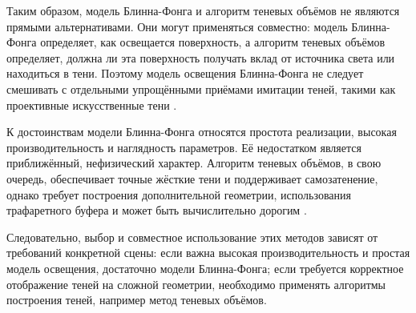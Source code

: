 \documentclass[a4paper, 12pt]{article}
\begin{document}
Таким образом, модель Блинна-Фонга и алгоритм теневых объёмов не являются прямыми альтернативами. Они могут применяться совместно: модель Блинна-Фонга определяет, как освещается поверхность, а алгоритм теневых объёмов определяет, должна ли эта поверхность получать вклад от источника света или находиться в тени. Поэтому модель освещения Блинна-Фонга не следует смешивать с отдельными упрощёнными приёмами имитации теней, такими как проективные искусственные тени \cite{blinn1988}.

К достоинствам модели Блинна-Фонга относятся простота реализации, высокая производительность и наглядность параметров. Её недостатком является приближённый, нефизический характер. Алгоритм теневых объёмов, в свою очередь, обеспечивает точные жёсткие тени и поддерживает самозатенение, однако требует построения дополнительной геометрии, использования трафаретного буфера и может быть вычислительно дорогим \cite{everitt2002,mcguire2003,stich2007,mcguire2004}.

Следовательно, выбор и совместное использование этих методов зависят от требований конкретной сцены: если важна высокая производительность и простая модель освещения, достаточно модели Блинна-Фонга; если требуется корректное отображение теней на сложной геометрии, необходимо применять алгоритмы построения теней, например метод теневых объёмов.
\end{document}

